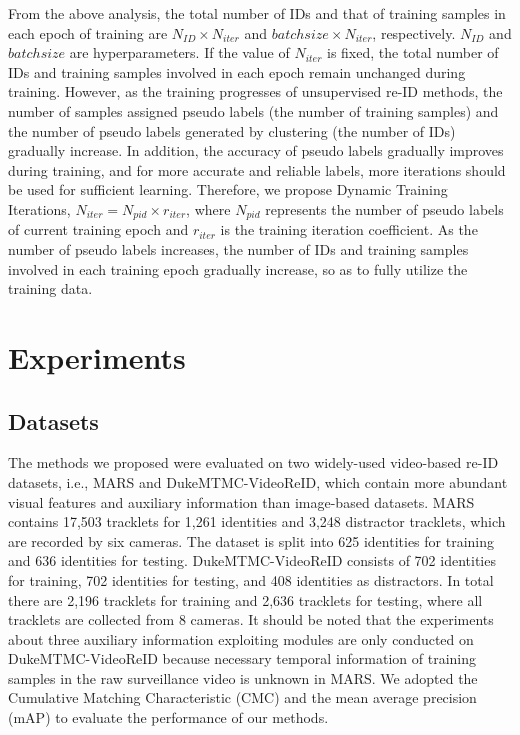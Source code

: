 \documentclass[10pt,twocolumn,letterpaper]{article}
\begin{document}
From the above analysis, the total number of IDs and that of training samples in each epoch of training are $N_{ID} \times N_{iter}$ and $batchsize \times N_{iter}$, respectively. $N_{ID}$ and $batchsize$ are hyperparameters. If the value of $N_{iter}$ is fixed, the total number of IDs and training samples involved in each epoch remain unchanged during training. However, as the training progresses of unsupervised re-ID methods, the number of samples assigned pseudo labels (the number of training samples) and the number of pseudo labels generated by clustering (the number of IDs) gradually increase. In addition, the accuracy of pseudo labels gradually improves during training, and for more accurate and reliable labels, more iterations should be used for sufficient learning. Therefore, we propose Dynamic Training Iterations, $N_{iter} = N_{pid} \times r_{iter}$, where $N_{pid}$ represents the number of pseudo labels of current training epoch and $r_{iter}$ is the training iteration coefficient. As the number of pseudo labels increases, the number of IDs and training samples involved in each training epoch gradually increase, so as to fully utilize the training data.

\section{Experiments}

\subsection{Datasets}

The methods we proposed were evaluated on two widely-used video-based re-ID datasets, i.e., MARS and DukeMTMC-VideoReID, which contain more abundant visual features and auxiliary information than image-based datasets. MARS contains 17,503 tracklets for 1,261 identities and 3,248 distractor tracklets, which are recorded by six cameras. The dataset is split into 625 identities for training and 636 identities for testing. DukeMTMC-VideoReID consists of 702 identities for training, 702 identities for testing, and 408 identities as distractors. In total there are 2,196 tracklets for training and 2,636 tracklets for testing, where all tracklets are collected from 8 cameras. It should be noted that the experiments about three auxiliary information exploiting modules are only conducted on DukeMTMC-VideoReID because necessary temporal information of training samples in the raw surveillance video is unknown in MARS. We adopted the Cumulative Matching Characteristic (CMC) and the mean average precision (mAP) to evaluate the performance of our methods.
\end{document}
